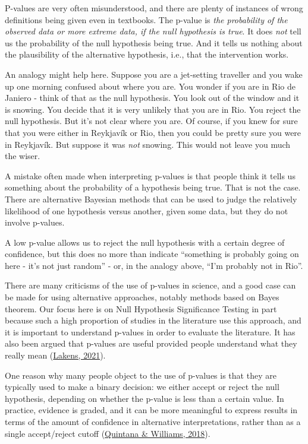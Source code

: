 \documentclass{krantz}
\begin{document}
P-values are very often misunderstood, and there are plenty of instances of wrong definitions being given even in textbooks. The p-value is \emph{the probability of the observed data or more extreme data, if the null hypothesis is true}. It does \emph{not} tell us the probability of the null hypothesis being true. And it tells us nothing about the plausibility of the alternative hypothesis, i.e., that the intervention works.

An analogy might help here. Suppose you are a jet-setting traveller and you wake up one morning confused about where you are. You wonder if you are in Rio de Janiero - think of that as the null hypothesis. You look out of the window and it is snowing. You decide that it is very unlikely that you are in Rio. You reject the null hypothesis. But it's not clear where you are. Of course, if you knew for sure that you were either in Reykjavík or Rio, then you could be pretty sure you were in Reykjavík. But suppose it was \emph{not} snowing. This would not leave you much the wiser.

A mistake often made when interpreting p-values is that people think it tells us something about the probability of a hypothesis being true. That is not the case. There are alternative Bayesian methods that can be used to judge the relatively likelihood of one hypothesis versus another, given some data, but they do not involve p-values.

A low p-value allows us to reject the null hypothesis with a certain degree of confidence, but this does no more than indicate ``something is probably going on here - it's not just random'' - or, in the analogy above, ``I'm probably not in Rio''.

\begin{tcolorbox}[colback=Black!5!lightgray,colframe=black!75!black,coltitle=white,title=Criticisms of the use of p-values]\label{box:pvalues}
There are many criticisms of the use of p-values in science, and a good case can be made for using alternative approaches, notably methods based on Bayes theorem. Our focus here is on Null Hypothesis Significance Testing in part because such a high proportion of studies in the literature use this approach, and it is important to understand p-values in order to evaluate the literature. It has also been argued that p-values are useful provided people understand what they really mean (\protect\hyperlink{ref-lakens2021}{Lakens, 2021}).

One reason why many people object to the use of p-values is that they are typically used to make a binary decision: we either accept or reject the null hypothesis, depending on whether the p-value is less than a certain value. In practice, evidence is graded, and it can be more meaningful to express results in terms of the amount of confidence in alternative interpretations, rather than as a single accept/reject cutoff (\protect\hyperlink{ref-quintana2018}{Quintana \& Williams, 2018}).
\end{tcolorbox}
\end{document}

